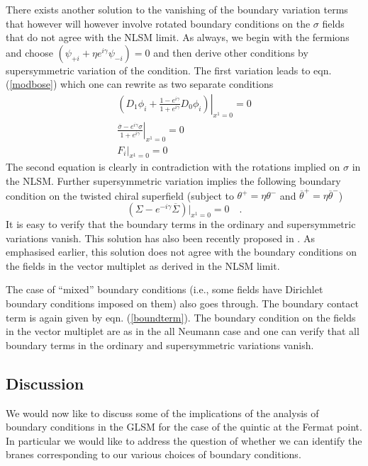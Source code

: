 \documentclass[a4paper,12pt]{article}
\begin{document}
There exists another solution to the vanishing of the boundary
variation terms that however will however 
involve rotated boundary conditions on
the $\sigma$ fields that do not agree with the NLSM limit. As always,
we begin with the fermions and choose 
$(\psi_{+i}+\eta e^{i\gamma} \psi_{-i})=0$ and then derive other
conditions by supersymmetric variation of the condition. The first
variation leads to eqn. (\ref{modbose}) which one can rewrite as two
separate conditions
\begin{eqnarray}
\left.\left(D_1\phi_i+\frac{1-e^{i\gamma}}{1+e^{i\gamma}}D_0\phi_i\right)
\right|_{x^1=0} =0 \\
\left.\frac{{\bar \sigma}-e^{i\gamma}\sigma}{1+e^{i\gamma}}\right|_{x^1=0}=0 \\
F_i|_{x^1=0}=0
\end{eqnarray}
The second equation is clearly in contradiction with the rotations
implied on $\sigma$ in the NLSM. Further supersymmetric variation
implies the following boundary condition on the twisted chiral
superfield (subject to $\theta^+ = \eta \theta^-$ and
$\overline{\theta}^+ = \eta \overline{\theta}^-$)
\begin{equation}
(\Sigma - e^{-i\gamma} \overline{\Sigma})|_{x^1=0}=0\quad.
\end{equation}
It is easy to verify that the boundary
terms in the ordinary and supersymmetric variations vanish.
This solution has also been recently proposed in \cite{HIV}. As emphasised 
earlier, this solution does not agree with the boundary conditions 
on the fields in the vector multiplet as derived in the NLSM limit.

The case of ``mixed'' boundary conditions (i.e., some fields have
Dirichlet boundary conditions imposed on them) also goes through.
The boundary contact term is again given by eqn. (\ref{boundterm}).
The boundary condition on the fields in the vector multiplet
are as in the all Neumann case and one can verify that 
all boundary terms in the ordinary and supersymmetric variations
vanish.


\subsection{Discussion}

	We would now like to discuss some of the implications of
the analysis of boundary conditions in the GLSM for the case of
the quintic at the Fermat point. In particular we would like to address
the question of whether we can identify the branes corresponding to our
various choices of boundary conditions. 
 
\end{document}
